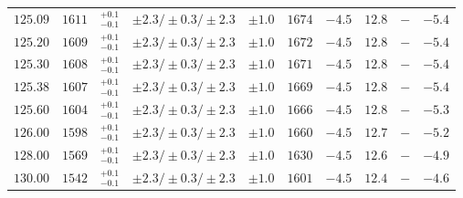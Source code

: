 \begin{table}[ht!]
\begin{center}
\begin{small}
\begin{tabular}{cccccccc|cc}
$125.09$ & $1611$ & $^{+0.1}_{-0.1}$ & $\pm 2.3/\pm 0.3/\pm 2.3$ & $\pm 1.0$ & $1674$ & $-4.5$ & $12.8$ & $-$ & $-5.4$ \\
$125.20$ & $1609$ & $^{+0.1}_{-0.1}$ & $\pm 2.3/\pm 0.3/\pm 2.3$ & $\pm 1.0$ & $1672$ & $-4.5$ & $12.8$ & $-$ & $-5.4$ \\
$125.30$ & $1608$ & $^{+0.1}_{-0.1}$ & $\pm 2.3/\pm 0.3/\pm 2.3$ & $\pm 1.0$ & $1671$ & $-4.5$ & $12.8$ & $-$ & $-5.4$ \\
$125.38$ & $1607$ & $^{+0.1}_{-0.1}$ & $\pm 2.3/\pm 0.3/\pm 2.3$ & $\pm 1.0$ & $1669$ & $-4.5$ & $12.8$ & $-$ & $-5.4$ \\
$125.60$ & $1604$ & $^{+0.1}_{-0.1}$ & $\pm 2.3/\pm 0.3/\pm 2.3$ & $\pm 1.0$ & $1666$ & $-4.5$ & $12.8$ & $-$ & $-5.3$ \\
$126.00$ & $1598$ & $^{+0.1}_{-0.1}$ & $\pm 2.3/\pm 0.3/\pm 2.3$ & $\pm 1.0$ & $1660$ & $-4.5$ & $12.7$ & $-$ & $-5.2$ \\
$128.00$ & $1569$ & $^{+0.1}_{-0.1}$ & $\pm 2.3/\pm 0.3/\pm 2.3$ & $\pm 1.0$ & $1630$ & $-4.5$ & $12.6$ & $-$ & $-4.9$ \\
$130.00$ & $1542$ & $^{+0.1}_{-0.1}$ & $\pm 2.3/\pm 0.3/\pm 2.3$ & $\pm 1.0$ & $1601$ & $-4.5$ & $12.4$ & $-$ & $-4.6$ \\
\bottomrule
\end{tabular}%
\end{small}%
\end{center}%
\end{table}

